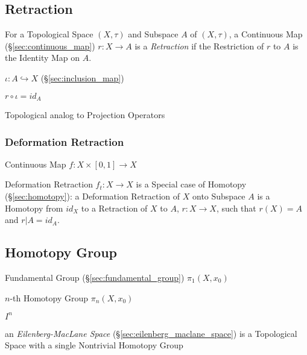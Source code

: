 \subsection{Retraction}\label{sec:subspace_retraction}

For a Topological Space $(X, \tau)$ and Subspace $A$ of $(X,\tau)$, a
Continuous Map (\S\ref{sec:continuous_map}) $r : X \rightarrow A$ is a
\emph{Retraction} if the Restriction of $r$ to $A$ is the Identity Map
on $A$.

$\iota : A \hookrightarrow X$ (\S\ref{sec:inclusion_map})

$r \circ \iota = id_A$

Topological analog to Projection Operators %
\cite{hatcher02}



\subsubsection{Deformation Retraction}\label{sec:deformation_retraction}

Continuous Map $f : X \times [0,1] \rightarrow X$

Deformation Retraction $f_t : X \rightarrow X$ is a Special case of
Homotopy (\S\ref{sec:homotopy}): a Deformation Retraction of $X$ onto
Subspace $A$ is a Homotopy from $id_X$ to a Retraction of $X$ to $A$,
$r : X \rightarrow X$, such that $r(X) = A$ and $r | A = id_A$.
\cite{hatcher02}



\subsection{Homotopy Group}\label{sec:homotopy_group}

Fundamental Group (\S\ref{sec:fundamental_group}) $\pi_1(X,x_0)$

$n$-th Homotopy Group $\pi_n(X,x_0)$

$I^n$

an \emph{Eilenberg-MacLane Space} (\S\ref{sec:eilenberg_maclane_space}) is a
Topological Space with a single Nontrivial Homotopy Group



